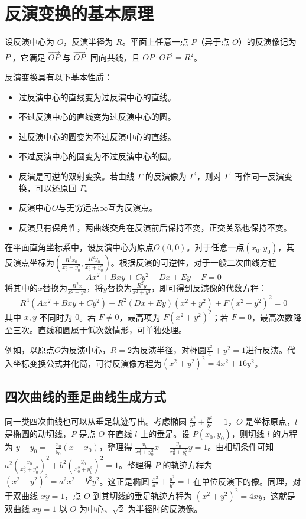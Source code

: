 \section{反演变换的基本原理}

设反演中心为 $O$，反演半径为 $R$。平面上任意一点 $P$（异于点 $O$）的反演像记为 $P^{\prime}$，它满足 $\overrightarrow{OP}$ 与 $\overrightarrow{OP}^{\prime}$ 同向共线，且 $OP\cdot OP^\prime=R^2$。

反演变换具有以下基本性质：
\begin{itemize}
    \item 过反演中心的直线变为过反演中心的直线。
    \item 不过反演中心的直线变为过反演中心的圆。
    \item 过反演中心的圆变为不过反演中心的直线。
    \item 不过反演中心的圆变为不过反演中心的圆。
    \item 反演是可逆的双射变换。若曲线 $\Gamma$ 的反演像为 $\Gamma^{\prime}$，则对 $\Gamma^{\prime}$ 再作同一反演变换，可以还原回 $\Gamma$。
    \item 反演中心$O$与无穷远点$\infty$互为反演点。
    \item 反演具有保角性，两曲线交角在反演前后保持不变，正交关系也保持不变。
\end{itemize}

在平面直角坐标系中，设反演中心为原点$O(0,0)$。对于任意一点$(x_0, y_0)$，其反演点坐标为$\left(\frac{R^{2}x_{0}}{x_{0}^{2}+y_{0}^{2}}, \frac{R^{2}y_{0}}{x_{0}^{2}+y_{0}^{2}}\right)$。根据反演的可逆性，对于一般二次曲线方程
$$Ax^{2}+Bxy+Cy^{2}+Dx+Ey+F=0$$
将其中的$x$替换为$\frac{R^{2}x}{x^{2}+y^{2}}$，将$y$替换为$\frac{R^{2}y}{x^{2}+y^{2}}$，即可得到反演像的代数方程：
$$R^{4}(Ax^{2}+Bxy+Cy^{2})+R^{2}(Dx+Ey)(x^{2}+y^{2})+F(x^{2}+y^{2})^{2}=0$$
其中 $x, y$ 不同时为 $0$。若 $F\ne0$，最高项为 $F(x^2+y^2)^2$；若 $F=0$，最高次数降至三次。直线和圆属于低次数情形，可单独处理。

例如，以原点$O$为反演中心，$R=2$为反演半径，对椭圆$\frac{x^{2}}{4}+y^{2}=1$进行反演。代入坐标变换公式并化简，可得反演像方程为$(x^{2}+y^{2})^{2}=4x^{2}+16y^{2}$。

\subsection{四次曲线的垂足曲线生成方式}
同一类四次曲线也可以从垂足轨迹写出。考虑椭圆 $\frac{x^2}{a^2}+\frac{y^2}{b^2}=1$，$O$ 是坐标原点，$l$ 是椭圆的动切线，$P$ 是点 $O$ 在直线 $l$ 上的垂足。设 $P(x_0, y_0)$，则切线 $l$ 的方程为 $y - y_0 = -\frac{x_0}{y_0}(x - x_0)$，整理得 $\frac{x_0}{x_0^2 + y_0^2}x + \frac{y_0}{x_0^2 + y_0^2}y = 1$。由相切条件可知 $a^2\left(\frac{x_0}{x_0^2 + y_0^2}\right)^2 + b^2\left(\frac{y_0}{x_0^2 + y_0^2}\right)^2 = 1$。整理得 $P$ 的轨迹方程为 $(x^2 + y^2)^2 = a^2x^2 + b^2y^2$。这正是椭圆 $\frac{x^2}{a^2}+\frac{y^2}{b^2}=1$ 在单位反演下的像。同理，对于双曲线 $xy = 1$，点 $O$ 到其切线的垂足轨迹方程为 $(x^2 + y^2)^2 = 4xy$，这就是双曲线 $xy = 1$ 以 $O$ 为中心、$\sqrt{2}$ 为半径时的反演像。

